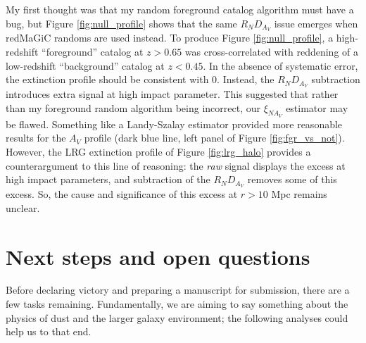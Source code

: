 \documentclass[11pt, oneside]{article}   	%
\begin{document}
My first thought was that my random foreground catalog algorithm must have a bug, but Figure \ref{fig:null_profile} shows that the same $R_N D_{A_V}$ issue emerges when redMaGiC randoms are used instead. To produce Figure \ref{fig:null_profile}, a high-redshift ``foreground'' catalog at $z > 0.65$ was cross-correlated with reddening of a low-redshift ``background'' catalog at $z < 0.45$. In the absence of systematic error, the extinction profile should be consistent with 0. Instead, the $R_N D_{A_V}$ subtraction introduces extra signal at high impact parameter. This suggested that rather than my foreground random algorithm being incorrect, our $\xi_{N A_V}$ estimator may be flawed. Something like a Landy-Szalay estimator provided more reasonable results for the $A_V$ profile (dark blue line, left panel of Figure \ref{fig:fgr_vs_not}). However, the LRG extinction profile of Figure \ref{fig:lrg_halo} provides a counterargument to this line of reasoning: the \textit{raw} signal displays the excess at high impact parameters, and subtraction of the $R_N D_{A_V}$ removes some of this excess. So, the cause and significance of this excess at $r > 10$ Mpc remains unclear. 







\section{Next steps and open questions}\label{sec:next_steps}

Before declaring victory and preparing a manuscript for submission, there are a few tasks remaining. Fundamentally, we are aiming to say something about the physics of dust and the larger galaxy environment; the following analyses could help us to that end.
\end{document}

